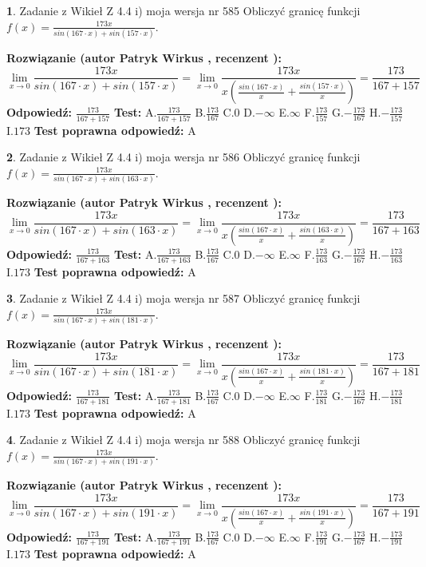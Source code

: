 \documentclass[12pt, a4paper]{article}
\theoremstyle{definition} %
\newtheorem{zad}{}
\newcommand{\zadStart}[1]{\begin{zad}#1\newline}
\newcommand{\zadStop}{\end{zad}}
\newcommand{\rozwStart}[2]{\noindent \textbf{Rozwiązanie (autor #1 , recenzent #2): }\newline}
\newcommand{\rozwStop}{\newline}
\newcommand{\odpStart}{\noindent \textbf{Odpowiedź:}\newline}
\newcommand{\odpStop}{\newline}
\newcommand{\testStart}{\noindent \textbf{Test:}\newline}
\newcommand{\testStop}{\newline}
\newcommand{\kluczStart}{\noindent \textbf{Test poprawna odpowiedź:}\newline}
\newcommand{\kluczStop}{\newline}
\begin{document}
\zadStart{Zadanie z Wikieł Z 4.4 i) moja wersja nr 585}
Obliczyć granicę funkcji $f(x)=\frac{173x}{sin(167\cdot x) +sin(157\cdot x)}$.
\zadStop
\rozwStart{Patryk Wirkus}{}
$$\lim\limits_{x\to 0}\frac{173x}{sin(167\cdot x) +sin(157\cdot x)}=\lim\limits_{x\to 0}\frac{173x}{x(\frac{sin(167\cdot x)}{x}+\frac{sin(157\cdot x)}{x})}=\frac{173}{167+157}$$
\rozwStop
\odpStart
$\frac{173}{167+157}$
\odpStop
\testStart
A.$\frac{173}{167+157}$
B.$\frac{173}{167}$
C.$0$
D.$-\infty$
E.$\infty$
F.$\frac{173}{157}$
G.$-\frac{173}{167}$
H.$-\frac{173}{157}$
I.$173$
\testStop
\kluczStart
A
\kluczStop



\zadStart{Zadanie z Wikieł Z 4.4 i) moja wersja nr 586}
Obliczyć granicę funkcji $f(x)=\frac{173x}{sin(167\cdot x) +sin(163\cdot x)}$.
\zadStop
\rozwStart{Patryk Wirkus}{}
$$\lim\limits_{x\to 0}\frac{173x}{sin(167\cdot x) +sin(163\cdot x)}=\lim\limits_{x\to 0}\frac{173x}{x(\frac{sin(167\cdot x)}{x}+\frac{sin(163\cdot x)}{x})}=\frac{173}{167+163}$$
\rozwStop
\odpStart
$\frac{173}{167+163}$
\odpStop
\testStart
A.$\frac{173}{167+163}$
B.$\frac{173}{167}$
C.$0$
D.$-\infty$
E.$\infty$
F.$\frac{173}{163}$
G.$-\frac{173}{167}$
H.$-\frac{173}{163}$
I.$173$
\testStop
\kluczStart
A
\kluczStop



\zadStart{Zadanie z Wikieł Z 4.4 i) moja wersja nr 587}
Obliczyć granicę funkcji $f(x)=\frac{173x}{sin(167\cdot x) +sin(181\cdot x)}$.
\zadStop
\rozwStart{Patryk Wirkus}{}
$$\lim\limits_{x\to 0}\frac{173x}{sin(167\cdot x) +sin(181\cdot x)}=\lim\limits_{x\to 0}\frac{173x}{x(\frac{sin(167\cdot x)}{x}+\frac{sin(181\cdot x)}{x})}=\frac{173}{167+181}$$
\rozwStop
\odpStart
$\frac{173}{167+181}$
\odpStop
\testStart
A.$\frac{173}{167+181}$
B.$\frac{173}{167}$
C.$0$
D.$-\infty$
E.$\infty$
F.$\frac{173}{181}$
G.$-\frac{173}{167}$
H.$-\frac{173}{181}$
I.$173$
\testStop
\kluczStart
A
\kluczStop



\zadStart{Zadanie z Wikieł Z 4.4 i) moja wersja nr 588}
Obliczyć granicę funkcji $f(x)=\frac{173x}{sin(167\cdot x) +sin(191\cdot x)}$.
\zadStop
\rozwStart{Patryk Wirkus}{}
$$\lim\limits_{x\to 0}\frac{173x}{sin(167\cdot x) +sin(191\cdot x)}=\lim\limits_{x\to 0}\frac{173x}{x(\frac{sin(167\cdot x)}{x}+\frac{sin(191\cdot x)}{x})}=\frac{173}{167+191}$$
\rozwStop
\odpStart
$\frac{173}{167+191}$
\odpStop
\testStart
A.$\frac{173}{167+191}$
B.$\frac{173}{167}$
C.$0$
D.$-\infty$
E.$\infty$
F.$\frac{173}{191}$
G.$-\frac{173}{167}$
H.$-\frac{173}{191}$
I.$173$
\testStop
\kluczStart
A
\kluczStop
\end{document}
